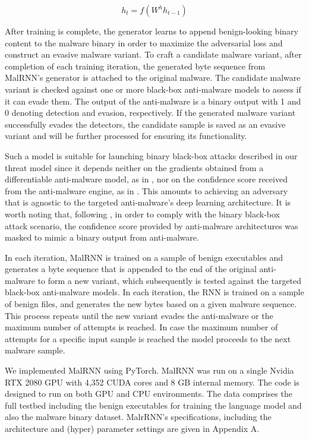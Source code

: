 \documentclass[letterpaper]{article}
\newcommand{\malrnn}{M\lowercase{a}lRNN }
\begin{document}
\begin{equation}
  h_t = f(W^{h}h_{t-1})
  \label {decoder_hidden}
\end{equation}

 After training is complete, the generator learns to append benign-looking binary content to the malware binary in order to maximize the adversarial loss and construct an evasive malware variant. To craft a candidate malware variant, after completion of each training iteration, the generated byte sequence from MalRNN's generator is attached to the original malware. The candidate malware variant is checked against one or more black-box anti-malware models to assess if it can evade them. The output of the anti-malware is a binary output with 1 and 0 denoting detection and evasion, respectively. If the generated malware variant successfully evades the detectors, the candidate sample is saved as an evasive variant and will be further processed for ensuring its functionality.

Such a model is suitable for launching binary black-box attacks described in our threat model since it depends neither on the gradients obtained from a differentiable anti-malware model, as in \cite{castroandbiggio2019poster,kolosnjaji2018adversarial}, nor on the confidence score received from the anti-malware engine, as in \cite{chen2017zoo}. This amounts to achieving an adversary that is agnostic to the targeted anti-malware's deep learning architecture. It is worth noting that, following \cite{anderson2018learning}, in order to comply with the binary black-box attack scenario, the confidence score provided by anti-malware architectures was masked to mimic a binary output from anti-malware.

In each iteration, \malrnn is trained on a sample of benign executables and generates a byte sequence that is appended to the end of the original anti-malware to form a new variant, which subsequently is tested against the targeted black-box anti-malware models. In each iteration, the RNN is trained on a sample of benign files, and generates the new bytes based on a given malware sequence. This process repeats until the new variant evades the anti-malware or the maximum number of attempts is reached. In case the maximum number of attempts for a specific input sample is reached the model proceeds to the next malware sample.

We implemented \malrnn using PyTorch. \malrnn was run on a single Nvidia RTX 2080 GPU with 4,352 CUDA cores and 8 GB internal memory. The code is designed to run on both GPU and CPU environments. The data comprises the full testbed including the benign executables for training the language model and also the malware binary dataset. MalrRNN's specifications, including the architecture and (hyper) parameter settings are given in Appendix A.
\end{document}
